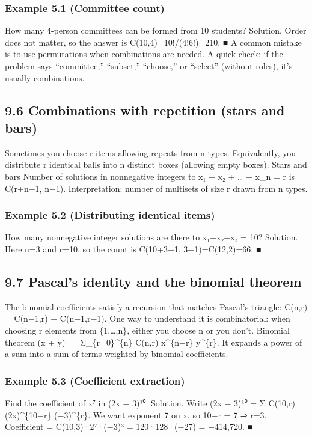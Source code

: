 \documentclass[11pt]{article}
\begin{document}
\subsubsection*{Example 5.1 (Committee count)}
How many 4-person committees can be formed from 10 students?
Solution. Order does not matter, so the answer is C(10,4)=10!/(4!6!)=210. ■
A common mistake is to use permutations when combinations are needed. A quick check:
if the problem says “committee,” “subset,” “choose,” or “select” (without roles), it’s
usually combinations.
\subsection{9.6 Combinations with repetition (stars and bars)}
Sometimes you choose r items allowing repeats from n types. Equivalently, you distribute
r identical balls into n distinct boxes (allowing empty boxes).
Stars and bars
Number of solutions in nonnegative integers to x₁ + x₂ + … + x\_n = r is C(r+n−1,
n−1).
Interpretation: number of multisets of size r drawn from n types.

\subsubsection*{Example 5.2 (Distributing identical items)}
How many nonnegative integer solutions are there to x₁+x₂+x₃ = 10?
Solution. Here n=3 and r=10, so the count is C(10+3−1, 3−1)=C(12,2)=66. ■
\subsection{9.7 Pascal’s identity and the binomial theorem}
The binomial coefficients satisfy a recursion that matches Pascal’s triangle: C(n,r) =
C(n−1,r) + C(n−1,r−1). One way to understand it is combinatorial: when choosing r
elements from \{1,…,n\}, either you choose n or you don’t.
Binomial theorem
(x + y)ⁿ = Σ\_\{r=0\}\textasciicircum{}\{n\} C(n,r) x\textasciicircum{}\{n−r\} y\textasciicircum{}\{r\}.
It expands a power of a sum into a sum of terms weighted by binomial coefficients.
\subsubsection*{Example 5.3 (Coefficient extraction)}
Find the coefficient of x⁷ in (2x − 3)¹⁰.
Solution. Write (2x − 3)¹⁰ = Σ C(10,r) (2x)\textasciicircum{}\{10−r\} (−3)\textasciicircum{}\{r\}.
We want exponent 7 on x, so 10−r = 7 ⇒ r=3.
Coefficient = C(10,3)·2⁷·(−3)³ = 120·128·(−27) = −414,720. ■
\end{document}
